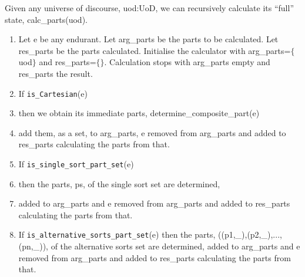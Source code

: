 \label{kap3.State Calculation}\label{kap3-gen-state}
\begynd
\pind Given any universe of discourse, \textsf{uod:UoD}, we can
      recursively calculate its ``full'' state, \textsf{calc\_parts({\LBRACE}uod{\RBRACE})}.
\afslut\LLll
\begin{enumerate}\setei
\item \label{uod:state:000} Let \textsf{e} be any endurant. \dbeat{\\}
      Let \textsf{arg\_parts} be the parts to be calculated. \dbeat{\\}
      Let \textsf{res\_parts} be the parts calculated. \dbeat{\\}
      Initialise the \textsf{calc}ulator with
      \textsf{arg\_parts=$\{$uod$\}$} and \textsf{res\_parts=$\{\}$}. \dbeat{\\}
      Calculation stops with \textsf{arg\_parts} empty and
      \textsf{res\_parts} the result.
\item \label{uod:state:010} If  \texttt{is\_Cartesian}(\textsf{e})  
\item \label{uod:state:010a}  then we obtain its
      immediate parts, \textsf{determine\_com\-po\-site\_\-part(e)}
\item \label{uod:state:010b} add them, as a set, to \textsf{arg\_parts}, \textsf{e}
      removed from  \textsf{arg\_parts} and added to
      \textsf{res\_parts} calculating the parts from that.
\item \label{uod:state:012} If 
      \texttt{is\_single\_sort\_part\_set}(\textsf{e}) 
\item \label{uod:state:013} then the parts,
      \textsf{ps}, of the single sort set are determined, 
\item \label{uod:state:014} added to \textsf{arg\_parts} and \textsf{e}
      removed from  \textsf{arg\_parts} and added to
      \textsf{res\_parts} calculating the parts from that.
\item \label{uod:state:016} If
      \texttt{is\_alternative\_sorts\_part\_set}(\textsf{e}) then the
      parts, \textsf{((p1,\_),(p2,\_),...,(pn,\_))}, of 
      the alternative sorts set are determined, added to \textsf{arg\_parts} and \textsf{e}
      removed from  \textsf{arg\_parts} and added to  \textsf{res\_parts} calculating the parts from that.
\savei\end{enumerate}
\pos{\psno}{\mnewfoil}
\noindent
{}\pos{}{\normalsize\HHHH\sf}
